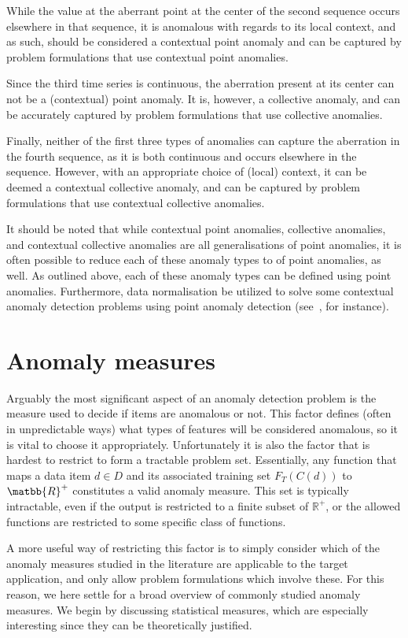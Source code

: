 While the value at the aberrant point at the center of the second sequence occurs elsewhere in that sequence, it is anomalous with regards to its local context, and as such, should be considered a contextual point anomaly and can be captured by problem formulations that use contextual point anomalies.

Since the third time series is continuous, the aberration present at its center can not be a (contextual) point anomaly. It is, however, a collective anomaly, and can be accurately captured by problem formulations that use collective anomalies.

Finally, neither of the first three types of anomalies can capture the aberration in the fourth sequence, as it is both continuous and occurs elsewhere in the sequence. However, with an appropriate choice of (local) context, it can be deemed a contextual collective anomaly, and can be captured by problem formulations that use contextual collective anomalies.

It should be noted that while contextual point anomalies, collective anomalies, and contextual collective anomalies are all generalisations of point anomalies, it is often possible to reduce each of these anomaly types to of point anomalies, as well. As outlined above, each of these anomaly types can be defined using point anomalies. Furthermore, data normalisation be utilized to solve some contextual anomaly detection problems using point anomaly detection (see~\cite{meckesheimer}, for instance).

\section{Anomaly measures}
\label{sect:anomaly_measures}

Arguably the most significant aspect of an anomaly detection problem is the measure used to decide if items are anomalous or not. This factor defines (often in unpredictable ways) what types of features will be considered anomalous, so it is vital to choose it appropriately. Unfortunately it is also the factor that is hardest to restrict to form a tractable problem set. Essentially, any function that maps a data item $d \in D$ and its associated training set $F_T(C(d))$ to $\matbb{R}^+$ constitutes a valid anomaly measure. This set is typically intractable, even if the output is restricted to a finite subset of $\mathbb{R}^+$, or the allowed functions are restricted to some specific class of functions.

A more useful way of restricting this factor is to simply consider which of the anomaly measures studied in the literature are applicable to the target application, and only allow problem formulations which involve these. For this reason, we here settle for a broad overview of commonly studied anomaly measures. We begin by discussing statistical measures, which are especially interesting since they can be theoretically justified.


